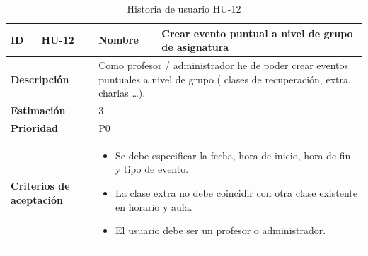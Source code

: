 \begin{table}[H]
    \centering
    \begin{tabular}{|p{2cm}|p{4cm}|p{2cm}|p{4cm}|}
        \hline
        \textbf{ID} & HU-12 & \textbf{Nombre} & Crear evento puntual a nivel de grupo de asignatura \\
        \hline
        \multicolumn{2}{|p{6cm}|}{\textbf{Descripción}} & \multicolumn{2}{p{6cm}|}{Como profesor / administrador he de poder crear eventos puntuales a nivel de grupo ( clases de recuperación, extra, charlas …).} \\
        \hline
        \multicolumn{2}{|p{6cm}|}{\textbf{Estimación}} & \multicolumn{2}{p{6cm}|}{3} \\
        \hline
        \multicolumn{2}{|p{6cm}|}{\textbf{Prioridad}} & \multicolumn{2}{p{6cm}|}{P0} \\
        \hline
        \multicolumn{2}{|p{6cm}|}{\textbf{Criterios de aceptación}} & \multicolumn{2}{p{6cm}|}{
            \begin{itemize}
                \item Se debe especificar la fecha, hora de inicio, hora de fin y tipo de evento.
                \item La clase extra no debe coincidir con otra clase existente en horario y aula.
                \item El usuario debe ser un profesor o administrador.
            \end{itemize}
        } \\
        \hline
    \end{tabular}
    \caption{Historia de usuario HU-12}
    \label{tab:hu_12}
\end{table}

